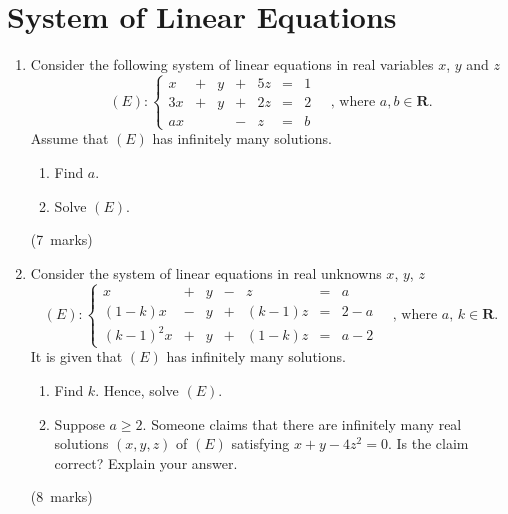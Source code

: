 \documentclass[12pt, a4paper]{article} %
\newcommand{\qmarks}[1]{\leavevmode\unskip\hspace*{\fill}\mbox{(#1 marks)}}
\begin{document}
\section{System of Linear Equations}
\begin{enumerate}
    \item Consider the following system of linear equations in real variables \(x\), \(y\) and \(z\) 
    \[
        (E): \left\{
        \begin{array}{ccccccc}
             x & + & y & + & 5z & = & 1 \\
            3x & + & y & + & 2z & = & 2 \\
            ax &   &   & - &  z & = & b
        \end{array}
        \right.
        \quad \text{, where } a, b \in \mathbf{R}.
    \]
    Assume that \((E)\) has infinitely many solutions.
    \begin{enumerate}
        \item Find \(a\).
        \item Solve \((E)\).
    \end{enumerate} \qmarks{7}

    \item Consider the system of linear equations in real unknowns \(x\), \(y\), \(z\)
    \[
        (E): \left\{
        \begin{array}{ccccccc}
             x & +  & y  & - & z  & = & a \\
            (1-k)x & - & y & + & (k-1)z & = & 2-a \\
            (k-1)^2x & +  & y  & + & (1-k)z  & = & a-2
        \end{array}
        \right.
        \quad \text{, where } a,\, k \in \mathbf{R}.
    \]
    It is given that \((E)\) has infinitely many solutions.
    \begin{enumerate}
        \item Find \(k\). Hence, solve \((E)\).
        \item Suppose \(a \geq 2\). Someone claims that there are infinitely many real solutions \((x,y,z)\) of \((E)\) satisfying \(x+y-4z^2=0\). Is the claim correct? Explain your answer.
    \end{enumerate}\qmarks{8}


\end{enumerate}
\end{document}

